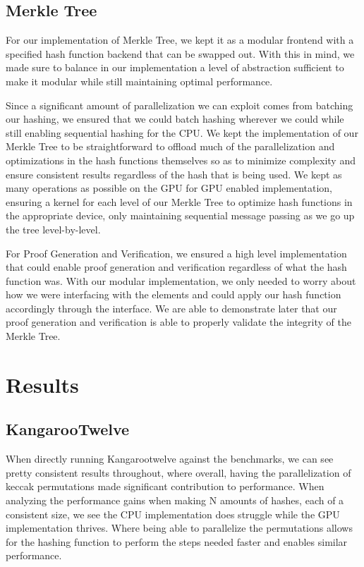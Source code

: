 \documentclass[conference]{IEEEtran}
\begin{document}
\subsection{Merkle Tree}

For our implementation of Merkle Tree, we kept it as a modular frontend with a specified hash function backend that can be swapped out. With this in mind, we made sure to balance in our implementation a level of abstraction sufficient to make it modular while still maintaining optimal performance.

Since a significant amount of parallelization we can exploit comes from batching our hashing, we ensured that we could batch hashing wherever we could while still enabling sequential hashing for the CPU. We kept the implementation of our Merkle Tree to be straightforward to offload much of the parallelization and optimizations in the hash functions themselves so as to minimize complexity and ensure consistent results regardless of the hash that is being used. We kept as many operations as possible on the GPU for GPU enabled implementation, ensuring a kernel for each level of our Merkle Tree to optimize hash functions in the appropriate device, only maintaining sequential message passing as we go up the tree level-by-level. 

For Proof Generation and Verification, we ensured a high level implementation that could enable proof generation and verification regardless of what the hash function was. With our modular implementation, we only needed to worry about how we were interfacing with the elements and could apply our hash function accordingly through the interface. We are able to demonstrate later that our proof generation and verification is able to properly validate the integrity of the Merkle Tree.

\section{Results}

\subsection{KangarooTwelve}

When directly running Kangarootwelve against the benchmarks, we can see pretty consistent results throughout, where overall, having the parallelization of keccak permutations made significant contribution to performance. When analyzing the performance gains when making N amounts of hashes, each of a consistent size, we see the CPU implementation does struggle while the GPU implementation thrives. Where being able to parallelize the permutations allows for the hashing function to perform the steps needed faster and enables similar performance.
\end{document}
